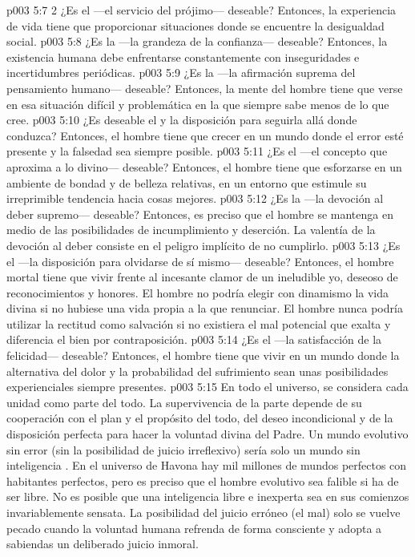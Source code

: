 \vs p003 5:7 2 ¿Es el  ---el servicio del prójimo--- deseable? Entonces, la experiencia de vida tiene que proporcionar situaciones donde se encuentre la desigualdad social.
\vs p003 5:8 ¿Es la  ---la grandeza de la confianza--- deseable? Entonces, la existencia humana debe enfrentarse constantemente con inseguridades e incertidumbres periódicas.
\vs p003 5:9 ¿Es la  ---la afirmación suprema del pensamiento humano--- deseable? Entonces, la mente del hombre tiene que verse en esa situación difícil y problemática en la que siempre sabe menos de lo que cree.
\vs p003 5:10 ¿Es deseable el  y la disposición para seguirla allá donde conduzca? Entonces, el hombre tiene que crecer en un mundo donde el error esté presente y la falsedad sea siempre posible.
\vs p003 5:11 ¿Es el  ---el concepto que aproxima a lo divino--- deseable? Entonces, el hombre tiene que esforzarse en un ambiente de bondad y de belleza relativas, en un entorno que estimule su irreprimible tendencia hacia cosas mejores.
\vs p003 5:12 ¿Es la  ---la devoción al deber supremo--- deseable? Entonces, es preciso que el hombre se mantenga en medio de las posibilidades de incumplimiento y deserción. La valentía de la devoción al deber consiste en el peligro implícito de no cumplirlo.
\vs p003 5:13 ¿Es el  ---la disposición para olvidarse de sí mismo--- deseable? Entonces, el hombre mortal tiene que vivir frente al incesante clamor de un ineludible yo, deseoso de reconocimientos y honores. El hombre no podría elegir con dinamismo la vida divina si no hubiese una vida propia a la que renunciar. El hombre nunca podría utilizar la rectitud como salvación si no existiera el mal potencial que exalta y diferencia el bien por contraposición.
\vs p003 5:14 ¿Es el  ---la satisfacción de la felicidad--- deseable? Entonces, el hombre tiene que vivir en un mundo donde la alternativa del dolor y la probabilidad del sufrimiento sean unas posibilidades experienciales siempre presentes.
\vs p003 5:15 \pc En todo el universo, se considera cada unidad como parte del todo. La supervivencia de la parte depende de su cooperación con el plan y el propósito del todo, del deseo incondicional y de la disposición perfecta para hacer la voluntad divina del Padre. Un mundo evolutivo sin error (sin la posibilidad de juicio irreflexivo) sería solo un mundo sin inteligencia . En el universo de Havona hay mil millones de mundos perfectos con habitantes perfectos, pero es preciso que el hombre evolutivo sea falible si ha de ser libre. No es posible que una inteligencia libre e inexperta sea en sus comienzos invariablemente sensata. La posibilidad del juicio erróneo (el mal) solo se vuelve pecado cuando la voluntad humana refrenda de forma consciente y adopta a sabiendas un deliberado juicio inmoral.
